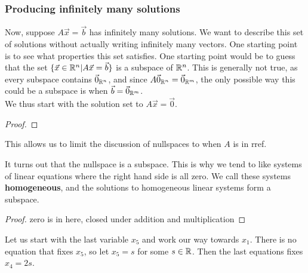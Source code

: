 \subsubsection*{Producing infinitely many solutions}
Now, suppose $A\vec{x}=\vec{b}$ has infinitely many solutions. We want to describe this set of solutions without actually
writing infinitely many vectors. One starting point is to see what properties this set satisfies. One starting point 
would be to guess that the set $\{\vec{x}\in\mathbb{R}^n | A\vec{x}=\vec{b}\}$ is a subspace of $\mathbb{R}^n$.
This is generally not true, as every subspace contains $\vec{0}_{\mathbb{R}^n}$, and since $A\vec{0}_{\mathbb{R}^n}=\vec{0}_{\mathbb{R}^m}$,
the only possible way this could be a subspace is when $\vec{b}=\vec{0}_{\mathbb{R}^m}$.\\

We thus start with the solution set to $A\vec{x}=\vec{0}$.
\begin{proof}
	\todo
\end{proof}
This allows us to limit the discussion of nullspaces to when $A$ is in rref.

It turns out that the nullspace is a subspace. This is why we tend to like systems of linear equations where the right hand side is all zero.
We call these systems \textbf{homogeneous}, and the solutions to homogeneous linear systems form a subspace.
\begin{proof}
	\todo zero is in here, closed under addition and multiplication
\end{proof}
Let us start with the last variable $x_5$ and work our way towards $x_1$.
There is no equation that fixes $x_5$, so let $x_5 = s$ for some $s\in\mathbb{R}$.
Then the last equations fixes $x_4 = 2s$. 

